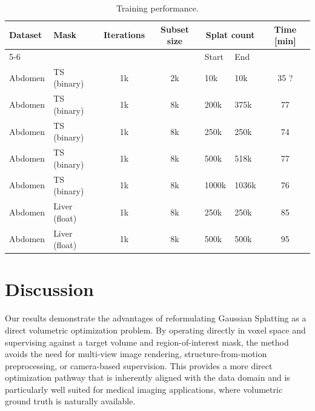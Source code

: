\documentclass[runningheads]{llncs}
\begin{document}
\begin{table}
\centering
\caption{Training performance.}\label{tab:training}
\setlength{\tabcolsep}{4pt}
\renewcommand{\arraystretch}{1.1}
\begin{tabular}{|l|l|c|c|l|l|c|}
\hline
Dataset & Mask & Iterations & Subset size & \multicolumn{2}{c|}{Splat count} & Time [min]\\
\cline{5-6}
 & & & & Start & End & \\
\hline
Abdomen & TS (binary)   & 1k & 2k & 10k    & 10k   & 35 ? \\
Abdomen & TS (binary)   & 1k & 8k  & 200k   & 375k  & 77 \\
Abdomen & TS (binary)   & 1k & 8k  & 250k   & 250k  & 74 \\
Abdomen & TS (binary)   & 1k & 8k  & 500k   & 518k  & 77 \\
Abdomen & TS (binary)   & 1k & 8k  & 1000k  & 1036k & 76 \\
Abdomen & Liver (float) & 1k & 8k  & 250k   & 250k  & 85 \\
Abdomen & Liver (float) & 1k & 8k  & 500k   & 500k  & 95 \\
\hline
\end{tabular}
\end{table}








\section{Discussion}

Our results demonstrate the advantages of reformulating Gaussian Splatting as a direct volumetric optimization problem. By operating directly in voxel space and supervising against a target volume and region-of-interest mask, the method avoids the need for multi-view image rendering, structure-from-motion preprocessing, or camera-based supervision. This provides a more direct optimization pathway that is inherently aligned with the data domain and is particularly well suited for medical imaging applications, where volumetric ground truth is naturally available.
\end{document}
